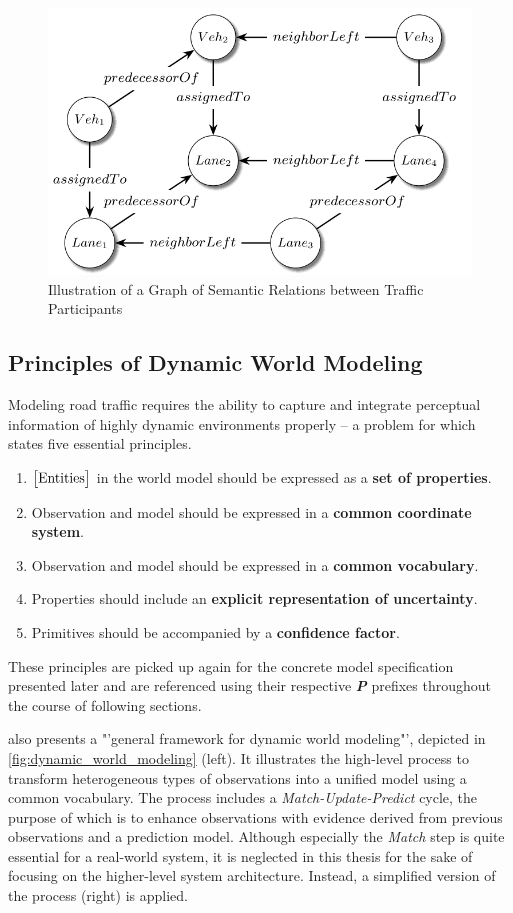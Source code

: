 \begin{figure}
	\centering
	\includegraphics[width=0.5\linewidth]{98_images/relations}
	\caption[Semantic Relations between Traffic Participants]{Illustration of a Graph of Semantic Relations between Traffic Participants \cite{Petrich2018}}
	\label{fig:relations}
\end{figure}

\subsection{Principles of Dynamic World Modeling}
\label{subsec:concept_design:principle_of_dynamic_world_modeling}

\begin{samepage}
	Modeling road traffic requires the ability to capture and integrate perceptual information of highly dynamic environments properly – a problem for which \cite{Crowley1993} states five essential principles.
	
	\begin{enumerate}[\ \ P1:]
		\item $\text{\big[Entities\big]}$ in the world model should be expressed as a \textbf{set of properties}.
		\item Observation and model should be expressed in a \textbf{common coordinate system}.
		\item Observation and model should be expressed in a \textbf{common vocabulary}.
		\item Properties should include an \textbf{explicit representation of uncertainty}.
		\item Primitives should be accompanied by a \textbf{confidence factor}.
	\end{enumerate}
\end{samepage}

These principles are picked up again for the concrete model specification presented later and are referenced using their respective \textit{\textbf{P}} prefixes throughout the course of following sections.

\cite{Crowley1993} also presents a "'general framework for dynamic world modeling"', depicted in \cref{fig:dynamic_world_modeling} (left). It illustrates the high-level process to transform heterogeneous types of observations into a unified model using a common vocabulary. The process includes a \textit{Match-Update-Predict} cycle, the purpose of which is to enhance observations with evidence derived from previous observations and a prediction model. Although especially the \textit{Match} step is quite essential for a real-world system, it is neglected in this thesis for the sake of focusing on the higher-level system architecture. Instead, a simplified version of the process (right) is applied.

